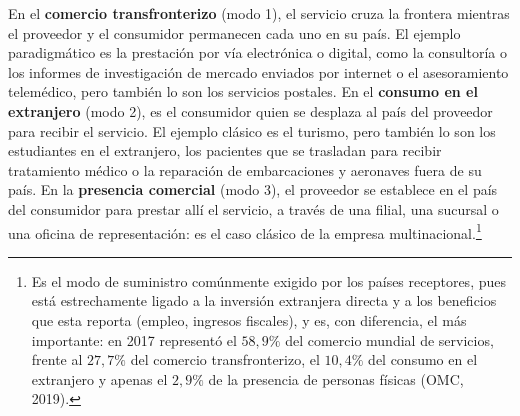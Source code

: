 \documentclass[10pt,a4paper]{article}
\begin{document}
En el \textbf{comercio transfronterizo} (modo 1), el servicio cruza la frontera mientras el proveedor y el consumidor permanecen cada uno en su país. El ejemplo paradigmático es la prestación por vía electrónica o digital, como la consultoría o los informes de investigación de mercado enviados por internet o el asesoramiento telemédico, pero también lo son los servicios postales. En el \textbf{consumo en el extranjero} (modo 2), es el consumidor quien se desplaza al país del proveedor para recibir el servicio. El ejemplo clásico es el turismo, pero también lo son los estudiantes en el extranjero, los pacientes que se trasladan para recibir tratamiento médico o la reparación de embarcaciones y aeronaves fuera de su país. En la \textbf{presencia comercial} (modo 3), el proveedor se establece en el país del consumidor para prestar allí el servicio, a través de una filial, una sucursal o una oficina de representación: es el caso clásico de la empresa multinacional.\footnote{%
    Es el modo de suministro comúnmente exigido por los países receptores, pues está estrechamente ligado a la inversión extranjera directa y a los beneficios que esta reporta (empleo, ingresos fiscales), y es, con diferencia, el más importante: en 2017 representó el $58,9\%$ del comercio mundial de servicios, frente al $27,7\%$ del comercio transfronterizo, el $10,4\%$ del consumo en el extranjero y apenas el $2,9\%$ de la presencia de personas físicas (OMC, 2019).

}
\end{document}
